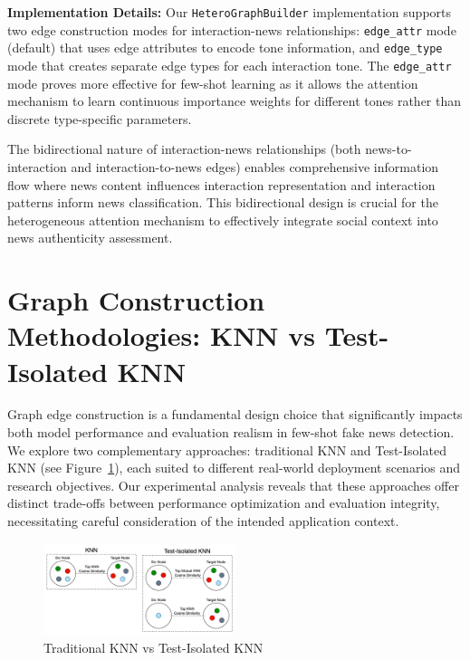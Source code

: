 \textbf{Implementation Details:} Our \texttt{HeteroGraphBuilder} implementation supports two edge construction modes for interaction-news relationships: \texttt{edge\_attr} mode (default) that uses edge attributes to encode tone information, and \texttt{edge\_type} mode that creates separate edge types for each interaction tone. The \texttt{edge\_attr} mode proves more effective for few-shot learning as it allows the attention mechanism to learn continuous importance weights for different tones rather than discrete type-specific parameters.

The bidirectional nature of interaction-news relationships (both news-to-interaction and interaction-to-news edges) enables comprehensive information flow where news content influences interaction representation and interaction patterns inform news classification. This bidirectional design is crucial for the heterogeneous attention mechanism to effectively integrate social context into news authenticity assessment.

\section{Graph Construction Methodologies: KNN vs Test-Isolated KNN}

Graph edge construction is a fundamental design choice that significantly impacts both model performance and evaluation realism in few-shot fake news detection. We explore two complementary approaches: traditional KNN and Test-Isolated KNN (see Figure~\ref{fig:edge_construction}), each suited to different real-world deployment scenarios and research objectives. Our experimental analysis reveals that these approaches offer distinct trade-offs between performance optimization and evaluation integrity, necessitating careful consideration of the intended application context.

\begin{figure}[h]
    \centering
    \includegraphics[width=0.5\textwidth]{context/methodology/fig/edge_construction.png}
    \caption{Traditional KNN vs Test-Isolated KNN}
    \label{fig:edge_construction}
\end{figure}

